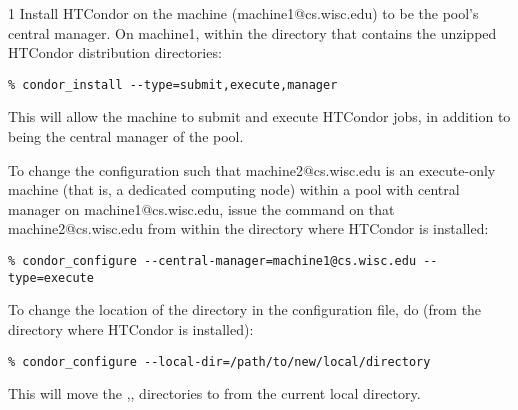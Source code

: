 \begin{ManPage}{\label{man-condor-configure}}{1}
\Examples
Install HTCondor on the machine (machine1@cs.wisc.edu)
to be the pool's central manager.
On machine1,
within the directory that contains the unzipped HTCondor
distribution directories:
\footnotesize
\begin{verbatim}
% condor_install --type=submit,execute,manager
\end{verbatim}
\normalsize
This will allow the machine to submit and execute HTCondor jobs, 
in addition to being the central manager of the pool.


To change the configuration such that
machine2@cs.wisc.edu is an execute-only machine
(that is, a dedicated computing node)
within a pool with central manager on machine1@cs.wisc.edu,
issue the command on that machine2@cs.wisc.edu
from within the directory where HTCondor is installed:
\footnotesize
\begin{verbatim}
% condor_configure --central-manager=machine1@cs.wisc.edu --type=execute
\end{verbatim}
\normalsize



To change the location of the  directory
in the configuration file, do (from the directory where HTCondor is installed):
\footnotesize
\begin{verbatim}
% condor_configure --local-dir=/path/to/new/local/directory
\end{verbatim}
\normalsize
This will move the ,, directories
to  from the current local directory.



\end{ManPage}
